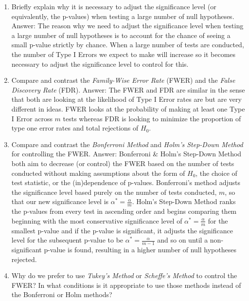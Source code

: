 \documentclass[
]{article}
\begin{document}
\begin{enumerate}
\def\labelenumi{\arabic{enumi}.}
\setcounter{enumi}{3}
\item
  Briefly explain why it is necessary to adjust the significance level
  (or equivalently, the p-values) when testing a large number of null
  hypotheses. Answer: The reason why we need to adjust the significance
  level when testing a large number of null hypotheses is to account for
  the chance of seeing a small p-value strictly by chance. When a large
  number of tests are conducted, the number of Type I Errors we expect
  to make will increase so it becomes necessary to adjust the
  significance level to control for this.
\item
  Compare and contrast the \emph{Family-Wise Error Rate} (FWER) and the
  \emph{False Discovery Rate} (FDR). Answer: The FWER and FDR are
  similar in the sense that both are looking at the likelihood of Type I
  Error rates are but are very different in ideas. FWER looks at the
  probability of making at least one Type I Error across \(m\) tests
  whereas FDR is looking to minimize the proportion of type one error
  rates and total rejections of \(H_0\).
\item
  Compare and contrast the \emph{Bonferroni Method} and \emph{Holm's
  Step-Down Method} for controlling the FWER. Answer: Bonferroni \&
  Holm's Step-Down Method both aim to decrease (or control) the FWER
  based on the number of tests conducted without making assumptions
  about the form of \(H_0\), the choice of test statistic, or the
  (in)dependence of p-values. Bonferroni's method adjusts the
  significance level based purely on the number of tests conducted,
  \(m\), so that our new significance level is
  \(\alpha^* = \frac{\alpha}{m}\). Holm's Step-Down Method ranks the
  p-values from every test in ascending order and begins comparing them
  beginning with the most conservative significance level of
  \(\alpha^* = \frac{\alpha}{m}\) for the smallest p-value and if the
  p-value is significant, it adjusts the significance level for the
  subsequent p-value to be \(\alpha^* = \frac{\alpha}{m - 1}\) and so on
  until a non-significant p-value is found, resulting in a higher number
  of null hypotheses rejected.
\item
  Why do we prefer to use \emph{Tukey's Method} or \emph{Scheffe's
  Method} to control the FWER? In what conditions is it appropriate to
  use those methods instead of the Bonferroni or Holm methods?
\end{enumerate}
\end{document}
